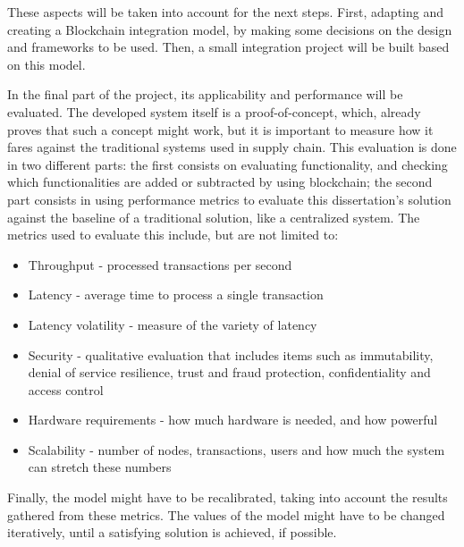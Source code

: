 These aspects will be taken into account for the next steps. First, adapting and creating a Blockchain integration model, by making some decisions on the design and frameworks to be used. Then, a small integration project will be built based on this model.

In the final part of the project, its applicability and performance will be evaluated. The developed system itself is a proof-of-concept, which, already proves that such a concept might work, but it is important to measure how it fares against the traditional systems used in supply chain. This evaluation is done in two different parts: the first consists on evaluating functionality, and checking which functionalities are added or subtracted by using blockchain; the second part consists in using performance metrics to evaluate this dissertation's solution against the baseline of a traditional solution, like a centralized system. The metrics used to evaluate this include, but are not limited to:
\begin{itemize}
\item Throughput - processed transactions per second
\item Latency - average time to process a single transaction
\item Latency volatility - measure of the variety of latency
\item Security - qualitative evaluation that includes items such as immutability, denial of service resilience, trust and fraud protection, confidentiality and access control
\item Hardware requirements - how much hardware is needed, and how powerful
\item Scalability - number of nodes, transactions, users and how much the system can stretch these numbers
\end{itemize}


Finally, the model might have to be recalibrated, taking into account the results gathered from these metrics. The values of the model might have to be changed iteratively, until a satisfying solution is achieved, if possible.

